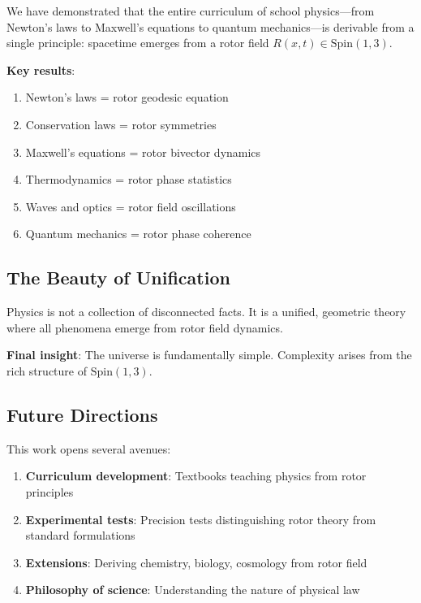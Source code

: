 \documentclass[12pt,a4paper]{article}
\theoremstyle{definition}
\theoremstyle{remark}
\begin{document}
We have demonstrated that the entire curriculum of school physics—from Newton's laws to Maxwell's equations to quantum mechanics—is derivable from a single principle: spacetime emerges from a rotor field $R(x,t) \in \mathrm{Spin}(1,3)$.

\textbf{Key results}:
\begin{enumerate}
\item Newton's laws = rotor geodesic equation
\item Conservation laws = rotor symmetries
\item Maxwell's equations = rotor bivector dynamics
\item Thermodynamics = rotor phase statistics
\item Waves and optics = rotor field oscillations
\item Quantum mechanics = rotor phase coherence
\end{enumerate}

\subsection{The Beauty of Unification}

Physics is not a collection of disconnected facts. It is a unified, geometric theory where all phenomena emerge from rotor field dynamics.

\textbf{Final insight}: The universe is fundamentally simple. Complexity arises from the rich structure of $\mathrm{Spin}(1,3)$.

\subsection{Future Directions}

This work opens several avenues:
\begin{enumerate}
\item \textbf{Curriculum development}: Textbooks teaching physics from rotor principles
\item \textbf{Experimental tests}: Precision tests distinguishing rotor theory from standard formulations
\item \textbf{Extensions}: Deriving chemistry, biology, cosmology from rotor field
\item \textbf{Philosophy of science}: Understanding the nature of physical law
\end{enumerate}
\end{document}
